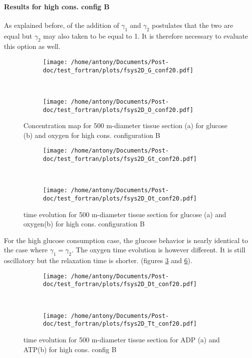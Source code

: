 \documentclass[11pt,a4paper]{article}
\begin{document}
\paragraph{Results for high cons. config B}
As explained before, of the addition of $\gamma_1$ and $\gamma_2$ postulates that the two are equal but $\gamma_2$ may also taken to be equal to 1. It is therefore necessary to evaluate this option as well.

\begin{figure}[ht!]
	\begin{subfigure}{0.45\textwidth}
	\centering
	\texttt{[image: /home/antony/Documents/Post-doc/test\_fortran/plots/fsys2D\_G\_conf20.pdf]}
	\caption{ \label{G_conf20}}
	\end{subfigure}
	~~
	\begin{subfigure}{0.45\textwidth}
	\texttt{[image: /home/antony/Documents/Post-doc/test\_fortran/plots/fsys2D\_O\_conf20.pdf]}
		\caption{ \label{O_conf20}}
	\end{subfigure}
	\caption{Concentration map for 500 \textmu m-diameter tissue section  (a) for glucose (b) and oxygen \label{conf20} for high cons. configuration B}
\end{figure} 

\begin{figure}[ht!]
	\begin{subfigure}{0.45\textwidth}
	\centering
	\texttt{[image: /home/antony/Documents/Post-doc/test\_fortran/plots/fsys2D\_Gt\_conf20.pdf]}
	\caption{ \label{Gt_conf20}}
	\end{subfigure}
	~~
	\begin{subfigure}{0.45\textwidth}
	\texttt{[image: /home/antony/Documents/Post-doc/test\_fortran/plots/fsys2D\_Ot\_conf20.pdf]}
		\caption{ \label{Ot_conf20}}
	\end{subfigure}
	\caption{time evolution for 500 \textmu m-diameter tissue section  for glucose (a) and oxygen(b) for high cons. configuration B \label{tconf20}}
\end{figure}

For the high glucose consumption case, the glucose behavior is nearly identical to the case where $\gamma_1 = \gamma_2$. The oxygen time evolution is however different. It is still oscillatory but the relaxation time is shorter. (figures \ref{conf20} and \ref{tconf20}).


\begin{figure}[ht!]
	\begin{subfigure}{0.45\textwidth}
	\centering
	\texttt{[image: /home/antony/Documents/Post-doc/test\_fortran/plots/fsys2D\_Dt\_conf20.pdf]}
	\caption{ \label{Dt_conf20}}
	\end{subfigure}
	~~
	\begin{subfigure}{0.45\textwidth}
	\texttt{[image: /home/antony/Documents/Post-doc/test\_fortran/plots/fsys2D\_Tt\_conf20.pdf]}
		\caption{ \label{Tt_conf20}}
	\end{subfigure}
	\caption{time evolution for 500 \textmu m-diameter tissue section  for ADP (a) and ATP(b) for high cons. config B \label{DTtconf20}}
\end{figure} 
\end{document}
